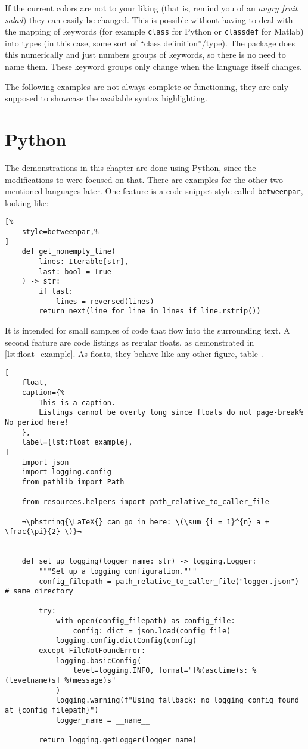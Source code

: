 If the current colors are not to your liking (that is, remind you of an
\emph{angry fruit salad}) they can easily be changed.
This is possible without having to deal with the mapping of keywords (for example
\lstinline[language={[3]Python}]|class| for Python or
\lstinline[language={[Custom]Matlab}]|classdef| for Matlab)
into types (in this case, some sort of \enquote{class definition}\-/type).
The  package does this numerically and just numbers groups of
keywords, so there is no need to name them.
These keyword groups only change when the language itself changes.

The following examples are not always complete or functioning, they are only supposed
to showcase the available syntax highlighting.

\section{Python}

The demonstrations in this chapter are done using Python, since the modifications to
 were focused on that.
There are examples for the other two mentioned languages later.
One feature is a code snippet style called \texttt{betweenpar}, looking like:
\begin{lstlisting}[%
    style=betweenpar,%
]
    def get_nonempty_line(
        lines: Iterable[str],
        last: bool = True
    ) -> str:
        if last:
            lines = reversed(lines)
        return next(line for line in lines if line.rstrip())
\end{lstlisting}
It is intended for small samples of code that flow into the surrounding text.
A second feature are code listings as regular floats, as demonstrated in
\cref{lst:float_example}.
As floats, they behave like any other figure, table .

\begin{lstlisting}[
    float,
    caption={%
        This is a caption.
        Listings cannot be overly long since floats do not page-break% No period here!
    },
    label={lst:float_example},
]
    import json
    import logging.config
    from pathlib import Path

    from resources.helpers import path_relative_to_caller_file

    ¬\phstring{\LaTeX{} can go in here: \(\sum_{i = 1}^{n} a + \frac{\pi}{2} \)}¬


    def set_up_logging(logger_name: str) -> logging.Logger:
        """Set up a logging configuration."""
        config_filepath = path_relative_to_caller_file("logger.json")  # same directory

        try:
            with open(config_filepath) as config_file:
                config: dict = json.load(config_file)
            logging.config.dictConfig(config)
        except FileNotFoundError:
            logging.basicConfig(
                level=logging.INFO, format="[%(asctime)s: %(levelname)s] %(message)s"
            )
            logging.warning(f"Using fallback: no logging config found at {config_filepath}")
            logger_name = __name__

        return logging.getLogger(logger_name)
\end{lstlisting}

